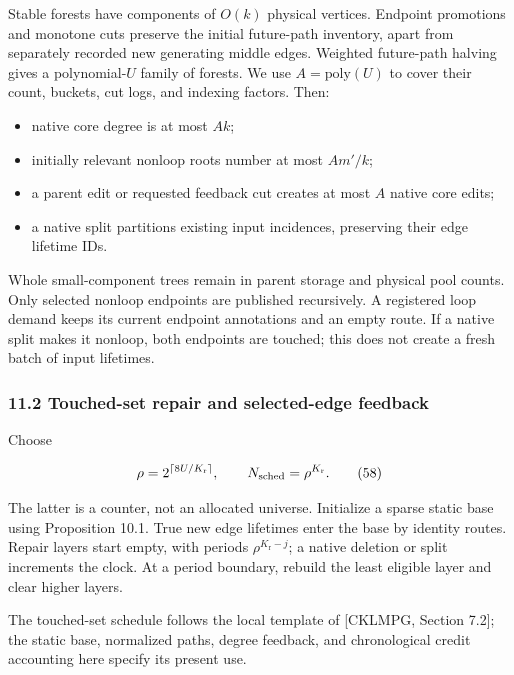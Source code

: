 Stable forests have components of \(O(k)\) physical vertices. Endpoint promotions and monotone cuts preserve the initial future-path inventory, apart from separately recorded new generating middle edges. Weighted future-path halving gives a polynomial-\(U\) family of forests. We use \(A=\mathrm{poly}(U)\) to cover their count, buckets, cut logs, and indexing factors. Then:

\begin{itemize}
\tightlist
\item
  native core degree is at most \(Ak\);
\item
  initially relevant nonloop roots number at most \(Am'/k\);
\item
  a parent edit or requested feedback cut creates at most \(A\) native core edits;
\item
  a native split partitions existing input incidences, preserving their edge lifetime IDs.
\end{itemize}

Whole small-component trees remain in parent storage and physical pool counts. Only selected nonloop endpoints are published recursively. A registered loop demand keeps its current endpoint annotations and an empty route. If a native split makes it nonloop, both endpoints are touched; this does not create a fresh batch of input lifetimes.

\hypertarget{af-46593eb93e-touched-set-repair-and-selected-edge-feedback}{%
\subsubsection{11.2 Touched-set repair and selected-edge feedback}\label{af-46593eb93e-touched-set-repair-and-selected-edge-feedback}}

Choose

\[
\rho=2^{\lceil8U/K_{\mathrm r}\rceil},\qquad
 N_{\rm sched}=\rho^{K_{\mathrm r}}.
 \tag{58}
\]

The latter is a counter, not an allocated universe. Initialize a sparse static base using Proposition 10.1. True new edge lifetimes enter the base by identity routes. Repair layers start empty, with periods \(\rho^{K_{\mathrm r}-j}\); a native deletion or split increments the clock. At a period boundary, rebuild the least eligible layer and clear higher layers.

The touched-set schedule follows the local template of {[}CKLMPG, Section 7.2{]}; the static base, normalized paths, degree feedback, and chronological credit accounting here specify its present use.

